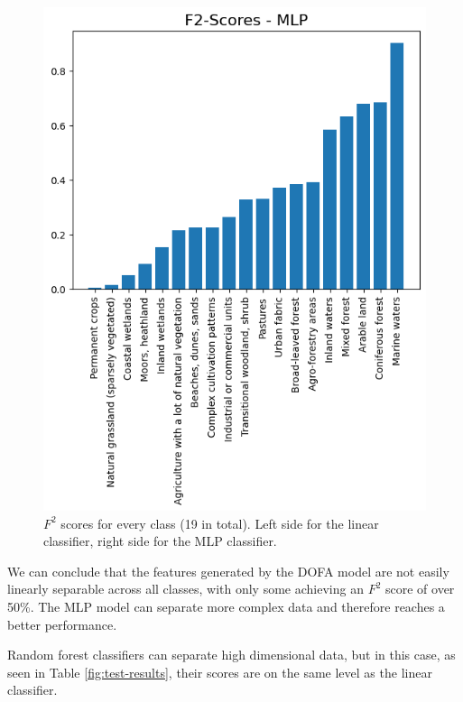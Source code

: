 \begin{figure}[h]
\begin{minipage}[b]{0.49\columnwidth}
    \includegraphics[width=\columnwidth]{images/MLP - f2 scores.png}
  \end{minipage}
  \caption{$F^2$ scores for every class (19 in total). Left side for the linear classifier, right side for the MLP classifier.}
  \label{fig:scores-by-class}
\end{figure}

We can conclude that the features generated by the DOFA model are not easily linearly separable across all classes, with only some achieving an $F^2$ score of over 50\%. The MLP model can separate more complex data and therefore reaches a better performance.

Random forest classifiers can separate high dimensional data, but in this case, as seen in Table \ref{fig:test-results}, their scores are on the same level as the linear classifier. %

